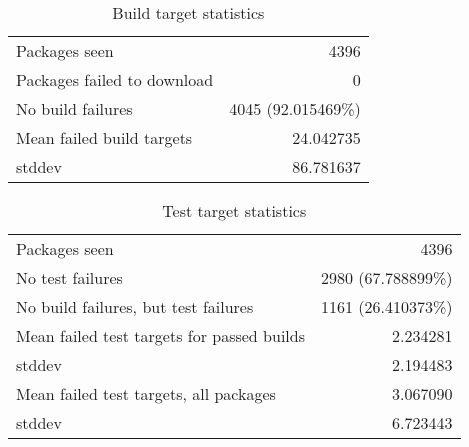 \begin{table}[ht]
\caption{Build target statistics}
\label{table:build}
\begin{tabular}{|l|r|}
 \hline
  Packages seen & 4396 \\
  Packages failed to download & 0 \\
  No build failures & 4045 (92.015469\%) \\
 \hline
  Mean failed build targets & 24.042735 \\
  stddev & 86.781637 \\
 \hline
\end{tabular}
\end{table}

\begin{table}[ht]
\caption{Test target statistics}
\label{table:test}
\begin{tabular}{|l|r|}
 \hline
  Packages seen & 4396 \\
  No test failures & 2980 (67.788899\%) \\
  No build failures, but test failures & 1161 (26.410373\%) \\
 \hline
  Mean failed test targets for passed builds & 2.234281 \\
  stddev & 2.194483 \\
 \hline
  Mean failed test targets, all packages& 3.067090 \\
  stddev & 6.723443 \\
 \hline
\end{tabular}
\end{table}

